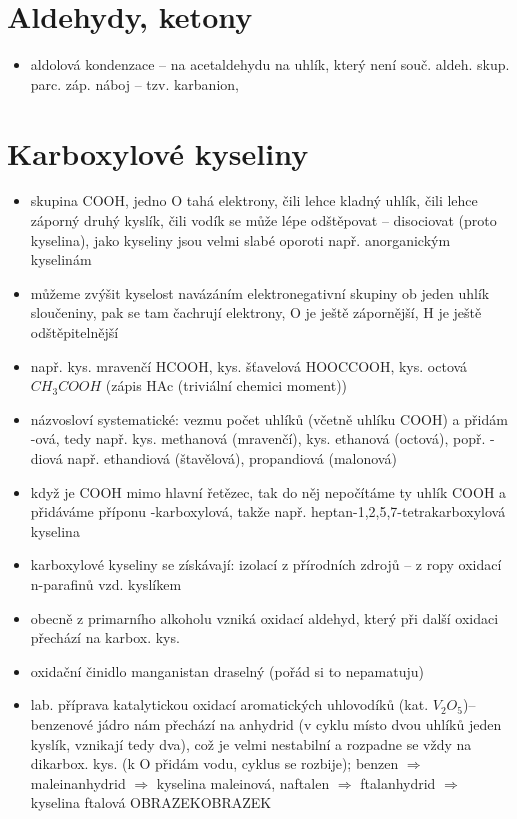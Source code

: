 \documentclass{article}
\begin{document}
\section{Aldehydy, ketony}
\begin{itemize}
  \item aldolová kondenzace -- na acetaldehydu na uhlík, který není souč. aldeh. skup. parc. záp. náboj -- tzv. karbanion,
\end{itemize}

\section{Karboxylové kyseliny}
\begin{itemize}
  \item skupina COOH, jedno O tahá elektrony, čili lehce kladný uhlík, čili lehce záporný druhý kyslík, čili vodík se může lépe odštěpovat -- disociovat (proto kyselina), jako kyseliny jsou velmi slabé oporoti např. anorganickým kyselinám
  \item můžeme zvýšit kyselost navázáním elektronegativní skupiny ob jeden uhlík sloučeniny, pak se tam čachrují elektrony, O je ještě zápornější, H je ještě odštěpitelnější
  \item např. kys. mravenčí HCOOH, kys. šťavelová HOOCCOOH, kys. octová $CH_{3}COOH$ (zápis HAc (triviální chemici moment))
  \item názvosloví systematické: vezmu počet uhlíků (včetně uhlíku COOH) a přidám -ová, tedy např. kys. methanová (mravenčí), kys. ethanová (octová), popř. -diová např. ethandiová (štavělová), propandiová (malonová)
  \item když je COOH mimo hlavní řetězec, tak do něj nepočítáme ty uhlík COOH a přidáváme příponu -karboxylová, takže např. heptan-1,2,5,7-tetrakarboxylová kyselina
  \item karboxylové kyseliny se získávají: izolací z přírodních zdrojů -- z ropy oxidací n-parafinů vzd. kyslíkem
  \item obecně z primarního alkoholu vzniká oxidací aldehyd, který při další oxidaci přechází na karbox. kys.
  \item oxidační činidlo manganistan draselný (pořád si to nepamatuju)
  \item lab. příprava katalytickou oxidací aromatických uhlovodíků (kat. $V_2O_5$)-- benzenové jádro nám přechází na anhydrid (v cyklu místo dvou uhlíků jeden kyslík, vznikají tedy dva), což je velmi nestabilní a rozpadne se vždy na dikarbox. kys. (k O přidám vodu, cyklus se rozbije); benzen $\Rightarrow$ maleinanhydrid $\Rightarrow$ kyselina maleinová, naftalen $\Rightarrow$ ftalanhydrid $\Rightarrow$ kyselina ftalová OBRAZEKOBRAZEK

\end{itemize}
\end{document}
